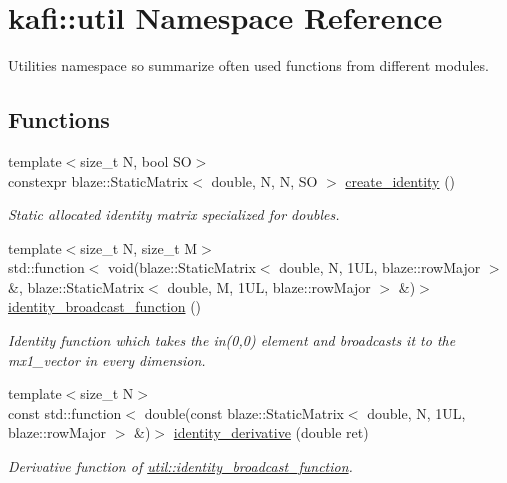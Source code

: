 \hypertarget{namespacekafi_1_1util}{}\section{kafi\+:\+:util Namespace Reference}
\label{namespacekafi_1_1util}


Utilities namespace so summarize often used functions from different modules.  


\subsection*{Functions}
\begin{DoxyCompactItemize}
\item 
{\footnotesize template$<$size\+\_\+t N, bool SO$>$ }\\constexpr blaze\+::\+Static\+Matrix$<$ double, N, N, SO $>$ \hyperlink{namespacekafi_1_1util_adebb31ac70499385be7e7693e9c73453}{create\+\_\+identity} ()
\begin{DoxyCompactList}\small\item\em Static allocated identity matrix specialized for doubles. \end{DoxyCompactList}\item 
{\footnotesize template$<$size\+\_\+t N, size\+\_\+t M$>$ }\\std\+::function$<$ void(blaze\+::\+Static\+Matrix$<$ double, N, 1\+U\+L, blaze\+::row\+Major $>$ \&, blaze\+::\+Static\+Matrix$<$ double, M, 1\+U\+L, blaze\+::row\+Major $>$ \&)$>$ \hyperlink{namespacekafi_1_1util_a9a257c47aefec8bf7538ab2ee5c4027d}{identity\+\_\+broadcast\+\_\+function} ()
\begin{DoxyCompactList}\small\item\em Identity function which takes the {\ttfamily in(0,0)} element and broadcasts it to the {\ttfamily mx1\+\_\+vector} in every dimension. \end{DoxyCompactList}\item 
{\footnotesize template$<$size\+\_\+t N$>$ }\\const std\+::function$<$ double(const blaze\+::\+Static\+Matrix$<$ double, N, 1\+U\+L, blaze\+::row\+Major $>$ \&)$>$ \hyperlink{namespacekafi_1_1util_af5c6d0524f5bd84aaaa74a1a1cc5512a}{identity\+\_\+derivative} (double ret)
\begin{DoxyCompactList}\small\item\em Derivative function of \hyperlink{namespacekafi_1_1util_a9a257c47aefec8bf7538ab2ee5c4027d}{util\+::identity\+\_\+broadcast\+\_\+function}. \end{DoxyCompactList}\item 

\end{DoxyCompactItemize}
